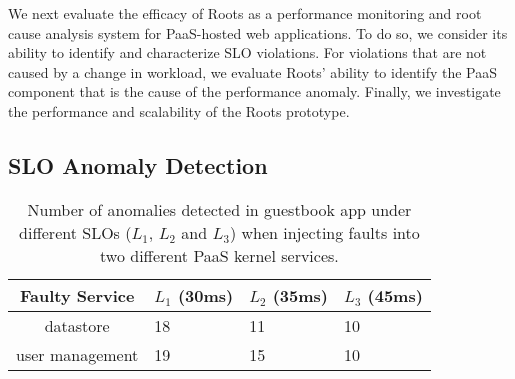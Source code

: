 We next evaluate the efficacy of Roots as a performance monitoring and root cause
analysis system for PaaS-hosted web applications.
To do so, we consider its ability to identify and characterize SLO violations.
For violations that are not caused by a change in workload, we evaluate Roots' ability to identify
the PaaS component that is the cause of the performance anomaly.
Finally, we investigate the performance and scalability of the Roots
prototype. 


\subsection{SLO Anomaly Detection}

\begin{table}
\caption{Number of anomalies detected in guestbook app under different SLOs 
($L_1$, $L_2$ and $L_3$) when injecting faults into two different PaaS kernel services.
\label{tab:anomaly_counts}}
{%
\begin{center}
\begin{tabular}{|c|p{1cm}|p{1cm}|p{1cm}|}
\hline
Faulty Service & $L_1$ (30ms) & $L_2$ (35ms) & $L_3$ (45ms) \\ \hline
datastore & 18 & 11 & 10 \\ \hline
user management & 19 & 15 & 10 \\ \hline
\end{tabular}
\end{center}
}
\vspace{-0.1in}
\end{table}

